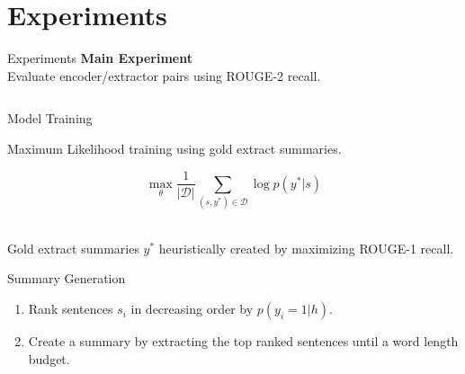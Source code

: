 
\section{Experiments}

\begin{frame}{Experiments}
%
    \alert<4>{\textbf{Main Experiment}}\\
    Evaluate encoder/extractor pairs using ROUGE-2 recall.\\
%
  \begin{columns}
    \begin{column}{0.3\textwidth}
      \begin{itemize}
      \end{itemize}
    \end{column}
    \begin{column}{0.7\textwidth}
         
    \end{column}
  \end{columns}
\end{frame}

\begin{frame}{Model Training}

    Maximum Likelihood training using gold extract summaries.

    \[\max_{\theta} \frac{1}{|\mathcal{D}|} \sum_{(s,y^*)\in \mathcal{D}} 
    \log p(y^*| s) \]

   
    ~\\

    Gold extract summaries $y^*$ heuristically created by maximizing ROUGE-1 recall.

\end{frame}

\begin{frame}{Summary Generation}

    \begin{enumerate}
        \item Rank sentences $s_i$ in decreasing order by $p(y_i=1|h)$.
        \item Create a summary by extracting the top ranked sentences until a word length budget.
    \end{enumerate}

\end{frame}

